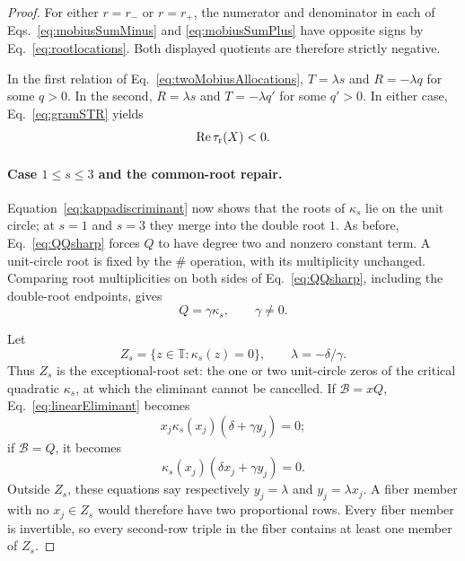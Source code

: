 \documentclass[aps,prx,reprint,nofootinbib,twoside,superscriptaddress,longbibliography,floatfix]{revtex4-2}
\theoremstyle{definition}
\newcommand{\T}{\mathbb T}
\newcommand{\RePart}{\operatorname{Re}}
\begin{document}
\begin{proof}
For either $r=r_-$ or $r=r_+$, the numerator and denominator in each of Eqs.~\eqref{eq:mobiusSumMinus} and \eqref{eq:mobiusSumPlus} have opposite signs by Eq.~\eqref{eq:rootlocations}.  Both displayed quotients are therefore strictly negative.

In the first relation of Eq.~\eqref{eq:twoMobiusAllocations}, $T=\lambda s$ and $R=-\lambda q$ for some $q>0$.  In the second, $R=\lambda s$ and $T=-\lambda q'$ for some $q'>0$.  In either case, Eq.~\eqref{eq:gramSTR} yields
\begin{equation}
\RePart\tau_{\rm r}(X)<0.
\label{eq:mobiusnegative}
\end{equation}

\paragraph{\texorpdfstring{Case $1\leq s\leq3$ and the common-root repair}{Case 1<=s<=3 and the common-root repair}.}

Equation~\eqref{eq:kappadiscriminant} now shows that the roots of $\kappa_s$ lie on the unit circle; at $s=1$ and $s=3$ they merge into the double root $1$. As before, Eq.~\eqref{eq:QQsharp} forces $Q$ to have degree two and nonzero constant term.  A unit-circle root is fixed by the $\#$ operation, with its multiplicity unchanged.  Comparing root multiplicities on both sides of Eq.~\eqref{eq:QQsharp}, including the double-root endpoints, gives
\begin{equation}
Q=\gamma\kappa_s,
\qquad \gamma\neq0.
\label{eq:QgammaKappa}
\end{equation}

Let
\begin{equation}
Z_s=\{z\in\T:\kappa_s(z)=0\},
\qquad \lambda=-\delta/\gamma.
\label{eq:Zs}
\end{equation}
Thus $Z_s$ is the exceptional-root set: the one or two unit-circle zeros of the critical quadratic $\kappa_s$, at which the eliminant cannot be cancelled. If $\mathcal B=xQ$, Eq.~\eqref{eq:linearEliminant} becomes
\begin{equation}
x_j\kappa_s(x_j)(\delta+\gamma y_j)=0;
\label{eq:commonrootcase1}
\end{equation}
if $\mathcal B=Q$, it becomes
\begin{equation}
\kappa_s(x_j)(\delta x_j+\gamma y_j)=0.
\label{eq:commonrootcase2}
\end{equation}
Outside $Z_s$, these equations say respectively $y_j=\lambda$ and $y_j=\lambda x_j$.  A fiber member with no $x_j\in Z_s$ would therefore have two proportional rows.  Every fiber member is invertible, so every second-row triple in the fiber contains at least one member of $Z_s$.


\end{proof}
\end{document}
